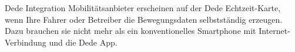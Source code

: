 
\begin{frame}{Dede Integration}
  Mobilitätsanbieter erscheinen auf der Dede Echtzeit-Karte, wenn Ihre Fahrer oder Betreiber die Bewegungsdaten selbstständig erzeugen. Dazu brauchen sie nicht mehr als ein konventionelles Smartphone mit Internet-Verbindung und die Dede App.
\end{frame}
